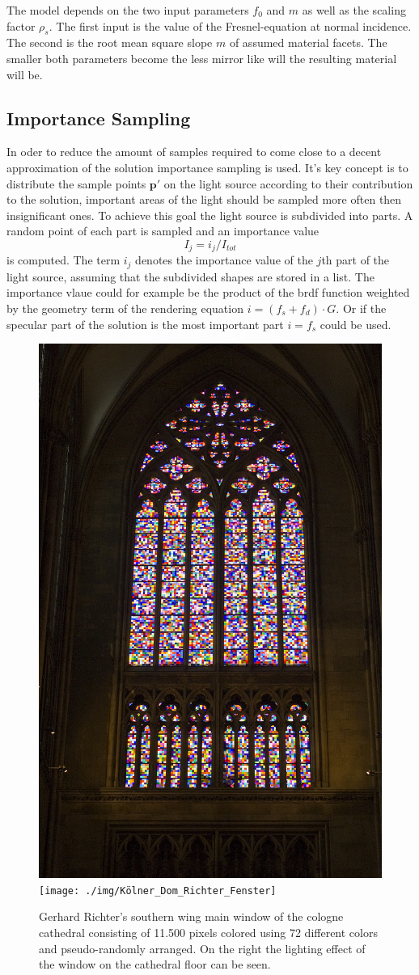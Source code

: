 The model depends on the two input parameters $f_0$ and $m$ as well as the scaling factor $\rho_s$. The first input is the value of the Fresnel-equation at normal incidence. The second is the root mean square slope $m$ of assumed material facets. The smaller both parameters become the less mirror like will the resulting material will be. 

\subsection{Importance Sampling}
In oder to  reduce the amount of samples required to come close to a decent approximation of the solution importance sampling is used. It's key concept is to distribute the sample points $\mathbf{p}'$ on the light source according to their contribution to the solution, important areas of the light should be sampled more often then insignificant ones. To achieve this goal the light source is subdivided into parts. A random point of each part is sampled and an importance value
\begin{equation}
I_j = i_j/I_{tot}
\end{equation}
is computed. The term $i_j$ denotes the importance value of the $j$th part of the light source, assuming that the subdivided shapes are stored in a list. The importance vlaue could for example be the product of the brdf function weighted by the geometry term of the rendering equation $i = (f_s + f_d) \cdot G$. Or if the specular part of the solution is the most important part $i = f_s$ could be used. \\
\begin{figure}
\centering
\includegraphics[width=0.25\linewidth]{./img/Richter_window_Cologne_Cathedral}
\texttt{[image: ./img/Kölner\_Dom\_Richter\_Fenster]}
\caption{Gerhard Richter's southern wing main window of the cologne cathedral consisting of 11.500 pixels colored using 72 different colors and pseudo-randomly arranged. On the right the lighting effect of the window on the cathedral floor can be seen.}
\label{fig:Richter_window_Cologne_Cathedral}
\end{figure}
